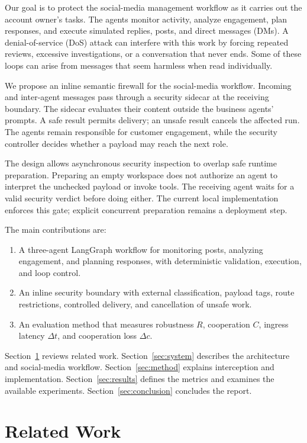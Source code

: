 \documentclass[conference]{IEEEtran}
\begin{document}
Our goal is to protect the social-media management workflow as it carries out the account owner's tasks. The agents monitor activity, analyze engagement, plan responses, and execute simulated replies, posts, and direct messages (DMs). A denial-of-service (DoS) attack can interfere with this work by forcing repeated reviews, excessive investigations, or a conversation that never ends. Some of these loops can arise from messages that seem harmless when read individually.

We propose an inline semantic firewall for the social-media workflow. Incoming and inter-agent messages pass through a security sidecar at the receiving boundary. The sidecar evaluates their content outside the business agents' prompts. A safe result permits delivery; an unsafe result cancels the affected run. The agents remain responsible for customer engagement, while the security controller decides whether a payload may reach the next role.

The design allows asynchronous security inspection to overlap safe runtime preparation. Preparing an empty workspace does not authorize an agent to interpret the unchecked payload or invoke tools. The receiving agent waits for a valid security verdict before doing either. The current local implementation enforces this gate; explicit concurrent preparation remains a deployment step.

The main contributions are:
\begin{enumerate}
\item A three-agent LangGraph workflow for monitoring posts, analyzing engagement, and planning responses, with deterministic validation, execution, and loop control.
\item An inline security boundary with external classification, payload tags, route restrictions, controlled delivery, and cancellation of unsafe work.
\item An evaluation method that measures robustness $R$, cooperation $C$, ingress latency $\Delta t$, and cooperation loss $\Delta c$.
\end{enumerate}

Section~\ref{sec:related} reviews related work. Section~\ref{sec:system} describes the architecture and social-media workflow. Section~\ref{sec:method} explains interception and implementation. Section~\ref{sec:results} defines the metrics and examines the available experiments. Section~\ref{sec:conclusion} concludes the report.

\section{Related Work}
\label{sec:related}
\end{document}
